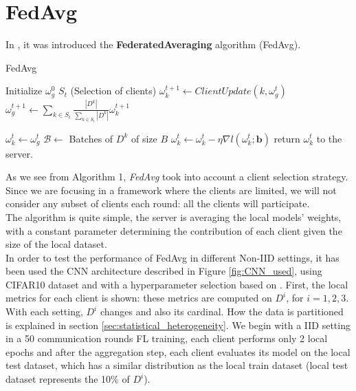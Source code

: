 \section{FedAvg}
In \cite*{mcmahan2023a}, it was introduced the \textbf{FederatedAveraging} algorithm (FedAvg).


\begin{algorithm}[H]
  \label{alg:FedAvg}
  \caption{FedAvg}
  \begin{algorithmic}[1]
    \Statex
    \State Initialize $\omega_g^0$
      \State $S_t$  (Selection of clients)
        \State $\omega_k^{t+1} \gets ClientUpdate(k, \omega_g^t)$
      \EndFor
      \State $\omega_g^{t+1} \gets \sum_{k \in S_t} \frac{|D^k|}{\sum_{k \in S_t} |D^k|} \omega_k^{t+1}$
    \EndFor
    \EndProcedure

    \State $\omega_k^t \gets \omega_g^t$
    \State $\mathcal{B} \gets$ Batches of $D^k$ of size $B$
        \State $\omega_k^t \gets \omega_k^t - \eta \nabla l(\omega_k^t; \mathbf{b})$
      \EndFor
    \EndFor
    \State return $\omega_k^t$ to the server.
    \EndProcedure
  \end{algorithmic}
\end{algorithm}

As we see from Algorithm 1, \textit{FedAvg} took into account a client selection strategy. Since we are focusing in a framework where the clients are limited, we will not consider any subset of clients each round: all the clients will participate.\\
The algorithm is quite simple, the server is averaging the local models' weights, with a constant parameter determining the contribution of each client given the size of the local dataset.\\
In order to test the performance of FedAvg in different Non-IID settings, it has been used the CNN architecture described in Figure \ref{fig:CNN_used}, using CIFAR10 dataset and with a hyperparameter selection based on \cite{li2021}. First, the local metrics for each client is shown: these metrics are computed on $D^i$, for $i=1,2,3$. With each setting, $D^i$ changes and also its cardinal. How the data is partitioned is explained in section \ref{sec:statistical_heterogeneity}.
We begin with a IID setting in a 50 communication rounds FL training, each client performs only 2 local epochs and after the aggregation step, each client evaluates its model on the local test dataset, which has a similar distribution as the local train dataset (local test dataset represents the 10\% of $D^i$).

